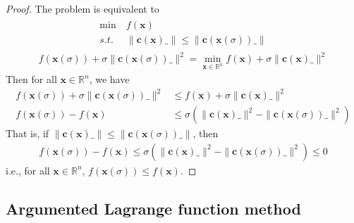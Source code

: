 \begin{proof}
    The problem is equivalent to
    \begin{align}
        \begin{array}{ll}
            \min \ &f(\mathbf{x}) \\
            s.t. \ &\parallel \mathbf{c}
            (\mathbf{x})\_ \parallel \leq
            \parallel \mathbf{c}
            (\mathbf{x}(\sigma))\_ \parallel
        \end{array}
    \end{align}
    \begin{align}
        f(\mathbf{x}(\sigma)) + \sigma \parallel \mathbf{c}
        (\mathbf{x}(\sigma))\_ \parallel^2 = 
        \min_{\mathbf{x} \in \mathbb{R}^n}
        f(\mathbf{x}) + \sigma \parallel \mathbf{c}
        (\mathbf{x})\_ \parallel^2
    \end{align}
    Then for all $\mathbf{x} \in \mathbb{R}^n$, we have
    \begin{align}
        f(\mathbf{x}(\sigma)) + \sigma \parallel \mathbf{c}
        (\mathbf{x}(\sigma))\_ \parallel^2 &\leq 
        f(\mathbf{x}) + \sigma \parallel \mathbf{c}
        (\mathbf{x})\_ \parallel^2 \\
        f(\mathbf{x}(\sigma)) - f(\mathbf{x}) &\leq
        \sigma(\parallel \mathbf{c}
        (\mathbf{x})\_ \parallel^2 - \parallel \mathbf{c}
        (\mathbf{x}(\sigma))\_ \parallel^2)
    \end{align}
    That is, if $\parallel \mathbf{c}
    (\mathbf{x})\_ \parallel \leq \parallel \mathbf{c}
    (\mathbf{x}(\sigma))\_ \parallel$, then
    \begin{align}
        f(\mathbf{x}(\sigma)) - f(\mathbf{x}) \leq
        \sigma(\parallel \mathbf{c}
        (\mathbf{x})\_ \parallel^2 - \parallel \mathbf{c}
        (\mathbf{x}(\sigma))\_ \parallel^2) \leq 0
    \end{align}
    i.e., for all $\mathbf{x} \in \mathbb{R}^n$,
    $f(\mathbf{x}(\sigma)) \leq f(\mathbf{x})$.
    
\end{proof}
\subsection{Argumented Lagrange function method}
